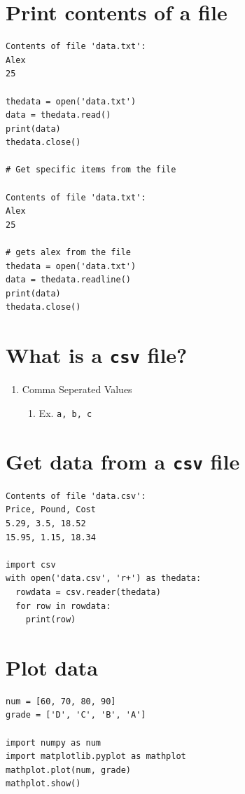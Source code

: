 \documentclass{article}
\begin{document}
\section{Print contents of a file}
\label{sec:org775f6d5}
\begin{verbatim}
Contents of file 'data.txt':
Alex
25

thedata = open('data.txt')
data = thedata.read()
print(data)
thedata.close()

# Get specific items from the file

Contents of file 'data.txt':
Alex
25

# gets alex from the file
thedata = open('data.txt')
data = thedata.readline()
print(data)
thedata.close()
\end{verbatim}

\section{What is a \texttt{csv} file?}
\label{sec:orgcd8f9e1}
\begin{enumerate}
\item Comma Seperated Values
\label{sec:orgd18dd40}
\begin{enumerate}
\item Ex. \texttt{a, b, c}
\label{sec:orgc57054b}
\end{enumerate}
\end{enumerate}

\section{Get data from a \texttt{csv} file}
\label{sec:orgfeb3c43}
\begin{verbatim}
Contents of file 'data.csv':
Price, Pound, Cost
5.29, 3.5, 18.52
15.95, 1.15, 18.34

import csv
with open('data.csv', 'r+') as thedata:
  rowdata = csv.reader(thedata)
  for row in rowdata:
    print(row)
\end{verbatim}


\section{Plot data}
\label{sec:orgeafea6f}
\begin{verbatim}
num = [60, 70, 80, 90]
grade = ['D', 'C', 'B', 'A']

import numpy as num
import matplotlib.pyplot as mathplot
mathplot.plot(num, grade)
mathplot.show()
\end{verbatim}
\end{document}
